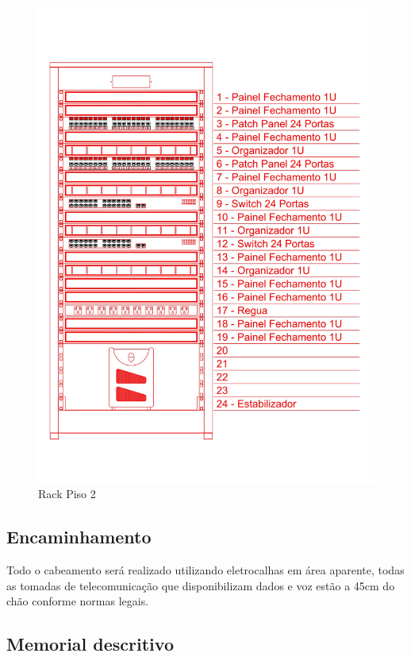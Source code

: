 \documentclass[	DIV=calc,%
							paper=a4,%
							fontsize=12pt,%
							onecolumn]{scrartcl}	 					%
\begin{document}
\begin{figure}
	\centering
	\includegraphics[width=\textwidth]{rack_p2}
	\caption{Rack Piso 2}
	\label{rack_p2}
\end{figure}
\FloatBarrier



\subsection{Encaminhamento}
Todo o cabeamento será realizado utilizando eletrocalhas em área aparente, todas as tomadas de telecomunicação que disponibilizam dados e voz estão a 45cm do chão conforme normas legais.

\subsection{Memorial descritivo}
\end{document}
